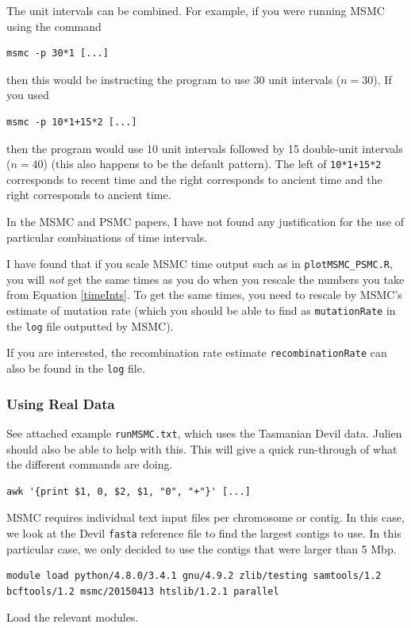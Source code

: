 \documentclass[11pt,a4paper]{article}
\begin{document}
The unit intervals can be combined. For example, if you were running MSMC using the command 
\begin{lstlisting}
msmc -p 30*1 [...]
\end{lstlisting}
then this would be instructing the program to use 30 unit intervals ($n = 30$). If you used 
\begin{lstlisting}
msmc -p 10*1+15*2 [...]
\end{lstlisting}
then the program would use 10 unit intervals followed by 15 double-unit intervals ($n = 40$) (this also happens to be the default pattern). The left of \texttt{10*1+15*2} corresponds to recent time and the right corresponds to ancient time and the right corresponds to ancient time.

In the MSMC and PSMC papers, I have not found any justification for the use of particular combinations of time intervals.

I have found that if you scale MSMC time output such as in \texttt{plotMSMC\_PSMC.R}, you will \emph{not} get the same times as you do when you rescale the numbers you take from Equation \ref{timeInts}. To get the same times, you need to rescale by MSMC's estimate of mutation rate (which you should be able to find as \texttt{mutationRate} in the \texttt{log} file outputted by MSMC).

If you are interested, the recombination rate estimate \texttt{recombinationRate} can also be found in the \texttt{log} file.

\subsubsection{Using Real Data}
See attached example \texttt{runMSMC.txt}, which uses the Tasmanian Devil data. Julien should also be able to help with this. This will give a quick run-through of what the different commands are doing.

\begin{lstlisting}
awk '{print $1, 0, $2, $1, "0", "+"}' [...]
\end{lstlisting}
MSMC requires individual text input files per chromosome or contig. In this case, we look at the Devil \texttt{fasta} reference file to find the largest contigs to use. In this particular case, we only decided to use the contigs that were larger than 5 Mbp.

\begin{lstlisting}
module load python/4.8.0/3.4.1 gnu/4.9.2 zlib/testing samtools/1.2 bcftools/1.2 msmc/20150413 htslib/1.2.1 parallel
\end{lstlisting}
Load the relevant modules.
\end{document}
